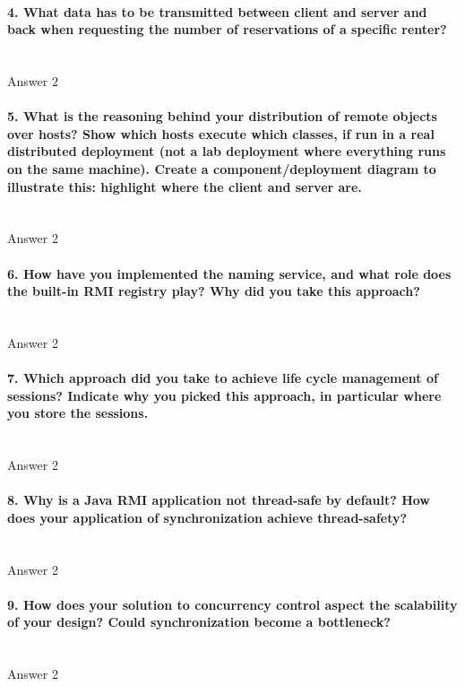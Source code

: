 \documentclass{ds-report}
\begin{document}
	\paragraph{4. What data has to be transmitted between client and server and back when requesting the number
of reservations of a specific renter?} \mbox{}\\
	Answer 2

	\paragraph{5. What is the reasoning behind your distribution of remote objects over hosts? Show which
hosts execute which classes, if run in a real distributed deployment (not a lab deployment where
everything runs on the same machine). Create a component/deployment diagram to illustrate this:
highlight where the client and server are.} \mbox{}\\
	Answer 2

	\paragraph{6. How have you implemented the naming service, and what role does the built-in RMI registry play?
Why did you take this approach?} \mbox{}\\
	Answer 2

	\paragraph{7. Which approach did you take to achieve life cycle management of sessions? Indicate why you
picked this approach, in particular where you store the sessions.} \mbox{}\\
	Answer 2

	\paragraph{8. Why is a Java RMI application not thread-safe by default? How does your application of synchronization achieve thread-safety?} \mbox{}\\
	Answer 2

	\paragraph{9. How does your solution to concurrency control aspect the scalability of your design? Could
synchronization become a bottleneck?} \mbox{}\\
	Answer 2

	
	\clearpage
	
	
\end{document}
